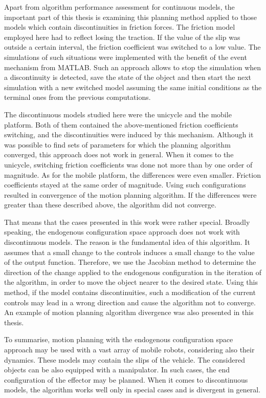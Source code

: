 Apart from algorithm performance assessment for continuous models, the important part of this thesis is examining this planning method applied to those models which contain discontinuities in friction forces. The friction model employed here had to reflect losing the traction. If the value of the slip was outside a certain interval, the friction coefficient was switched to a low value. The simulations of such situations were implemented with the benefit of the event mechanism from MATLAB. Such an approach allows to stop the simulation when a discontinuity is detected, save the state of the object and then start the next simulation with a new switched model assuming the same initial conditions as the terminal ones from the previous computations.

The discontinuous models studied here were the unicycle and the mobile platform. Both of them contained the above-mentioned friction coefficients switching, and the discontinuities were induced by this mechanism. Although it was possible to find sets of parameters for which the planning algorithm converged, this approach does not work in general. When it comes to the unicycle, switching friction coefficients was done not more than by one order of magnitude. As for the mobile platform, the differences were even smaller. Friction coefficients stayed at the same order of magnitude. Using such configurations resulted in convergence of the motion planning algorithm. If the differences were greater than these described above, the algorithm did not converge.

That means that the cases presented in this work were rather special. Broadly speaking, the endogenous configuration space approach does not work with discontinuous models. The reason is the fundamental idea of this algorithm. It assumes that a small change to the controls induces a small change to the value of the output function. Therefore, we use the Jacobian method to determine the direction of the change applied to the endogenous configuration in the iteration of the algorithm, in order to move the object nearer to the desired state. Using this method, if the model contains discontinuities, such a modification of the current controls may lead in a wrong direction and cause the algorithm not to converge. An example of motion planning algorithm divergence was also presented in this thesis.

To summarise, motion planning with the endogenous configuration space approach may be used with a vast array of mobile robots, considering also their dynamics. These models may contain the slips of the vehicle. The considered objects can be also equipped with a manipulator. In such cases, the end configuration of the effector may be planned. When it comes to discontinuous models, the algorithm works well only in special cases and is divergent in general.